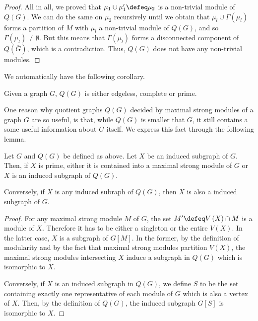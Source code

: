 \documentclass{article}
\begin{document}
\begin{proof}
        All in all, we proved that $\mu_1 \cup \mu_1' \defeq \mu_2$
        is a non-trivial module of $Q\left(G\right)$. 
        We can do the same on $\mu_2$ recursively until we obtain that
        $\mu_{l} \cup \Gamma\left(\mu_{l}\right)$ forms a partition of $M$ 
        with $\mu_{l}$ a non-trivial module of $Q\left(G\right)$, 
        and so $\Gamma\left(\mu_{l}\right) \neq \emptyset$.
        But this means that $\Gamma\left(\mu_{l}\right)$ forms
        a disconnected component of $Q\left(\overline{G}\right)$, which is a contradiction.
        Thus, $Q\left(G\right)$ does not have any non-trivial modules.
    \end{proof}
    
    We automatically have the following corollary.

    \begin{cor}
        Given a graph $G$, $Q\left(G\right)$
        is either edgeless, complete or prime.
    \end{cor}   
    
    One reason why
    quotient graphs $Q\left(G\right)$
    decided by maximal strong
    modules of a graph $G$ 
    are so useful, is
    that, while $Q\left(G\right)$
    is smaller that $G$, 
    it still contains a some
    useful information about
    $G$ itself. We express
    this fact through the following lemma.

    \begin{lemma} \label{prime lemma}
        Let $G$ and $Q\left(G\right)$
        be defined as above.
        Let $X$ be an
        induced subgraph
        of $G$. Then,
        if $X$ is prime, either
        it is contained into 
        a maximal strong module
        of $G$ or $X$ is 
        an induced subgraph of $Q\left(G\right)$.

        Conversely, if $X$ is any induced subraph of $Q\left(G\right)$,
        then $X$ is also a induced subgraph of $G$.
    \end{lemma}
    \begin{proof}
        For any maximal strong module $M$ of
        $G$, the set $M' \defeq V\left(X\right) \cap M$
        is a module of $X$. Therefore
        it has to be either a singleton or
        the entire $V\left(X\right)$.
        In the latter case, $X$ is a subgraph
        of $G\left[M\right]$.
        In the former,
        by the definition
        of modularity
        and by the fact
        that maximal strong
        modules partition
        $V\left(X\right)$,
        the maximal strong modules
        intersecting $X$ induce a subgraph
        in $Q\left(G\right)$ which is
        isomorphic to $X$.

        Conversely, if $X$ is 
        an induced subgraph
        in $Q\left(G\right)$,
        we define 
        $S$ to be the
        set containing exactly
        one representative of each
        module of $G$ which is
        also a vertex of $X$.
        Then, by the definition
        of $Q\left(G\right)$,
        the induced
        subgraph $G\left[S\right]$ 
        is isomorphic to $X$.
    \end{proof}
\end{document}
